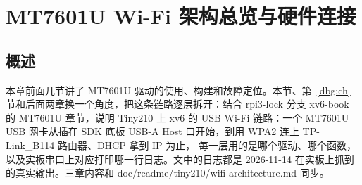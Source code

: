 \usetikzlibrary{backgrounds}
\providecommand{\fn}[1]{{\ttfamily\small #1}}
\providecommand{\seqhead}[3]{\node[wbox=tinyblue,minimum width=22mm,font=\footnotesize] (#2) at (#1,0) {#3};}
\providecommand{\seqline}[2]{\draw[dashed,wgray] (#1,-0.45) -- (#1,-#2);}
\providecommand{\seqmsg}[4]{\draw[-{Stealth[length=2mm]},thick,tinyblue] (#1,-#3) -- node[above,font=\scriptsize,inner sep=1pt]{#4} (#2,-#3);}
\providecommand{\seqret}[4]{\draw[-{Stealth[length=2mm]},thick,dashed,tinygreen] (#1,-#3) -- node[above,font=\scriptsize,inner sep=1pt]{#4} (#2,-#3);}
\providecommand{\seqself}[3]{\draw[-{Stealth[length=2mm]},thick,wamber] (#1,-#2) -- ++(0.35,0) -- ++(0,-0.3) -- ++(-0.35,0);
  \node[right,font=\scriptsize,align=left] at (#1+0.4,-#2-0.15) {#3};}
\providecommand{\seqnote}[4]{\node[draw=wamber,fill=wamber!10,font=\scriptsize,anchor=north west,inner sep=2pt] at (#1,-#3) {#4};}

\section{MT7601U Wi-Fi 架构总览与硬件连接}\label{wa:ch-05a-wifi-arch-hw}
\subsection{概述}

本章前面几节讲了 MT7601U 驱动的使用、构建和故障定位。本节、第~\ref{dbg:ch} 节和后面两章换一个角度，把这条链路逐层拆开：结合 rpi3-lock 分支 xv6-book 的 MT7601U 章节，说明 Tiny210 上 xv6 的 USB Wi-Fi 链路：一个 MT7601U USB 网卡从插在
SDK 底板 USB-A Host 口开始，到用 WPA2 连上 TP-Link\_B114 路由器、DHCP 拿到 IP 为止，
每一层用的是哪个驱动、哪个函数，以及实板串口上对应打印哪一行日志。文中的日志都是
2026-11-14 在实板上抓到的真实输出。三章内容和
\fn{doc/readme/tiny210/wifi-architecture.md} 同步。

